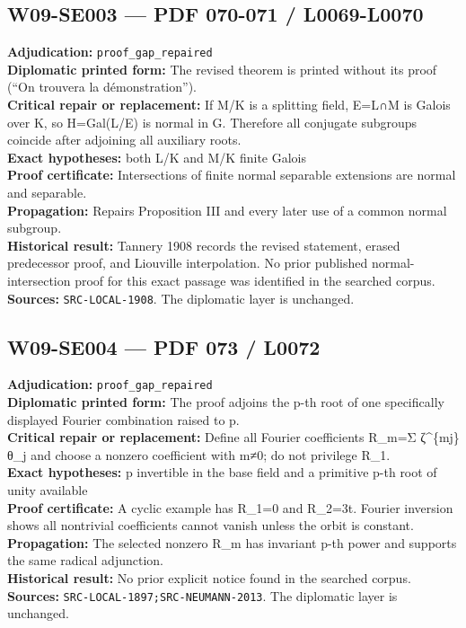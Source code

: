 \documentclass[
  10pt,
  a4paper,
]{scrreprt}
\begin{document}
\subsection{W09-SE003 --- PDF 070-071 /
L0069-L0070}\label{w09-se003-pdf-070-071-l0069-l0070}

\textbf{Adjudication:} \texttt{proof\_gap\_repaired}\\
\textbf{Diplomatic printed form:} The revised theorem is printed without
its proof (``On trouvera la démonstration'').\\
\textbf{Critical repair or replacement:} If M/K is a splitting field,
E=L∩M is Galois over K, so H=Gal(L/E) is normal in G. Therefore all
conjugate subgroups coincide after adjoining all auxiliary roots.\\
\textbf{Exact hypotheses:} both L/K and M/K finite Galois\\
\textbf{Proof certificate:} Intersections of finite normal separable
extensions are normal and separable.\\
\textbf{Propagation:} Repairs Proposition III and every later use of a
common normal subgroup.\\
\textbf{Historical result:} Tannery 1908 records the revised statement,
erased predecessor proof, and Liouville interpolation. No prior
published normal-intersection proof for this exact passage was
identified in the searched corpus.\\
\textbf{Sources:} \texttt{SRC-LOCAL-1908}. The diplomatic layer is
unchanged.

\subsection{W09-SE004 --- PDF 073 /
L0072}\label{w09-se004-pdf-073-l0072}

\textbf{Adjudication:} \texttt{proof\_gap\_repaired}\\
\textbf{Diplomatic printed form:} The proof adjoins the p-th root of one
specifically displayed Fourier combination raised to p.\\
\textbf{Critical repair or replacement:} Define all Fourier coefficients
R\_m=Σ ζ\^{}\{mj\}θ\_j and choose a nonzero coefficient with m≠0; do not
privilege R\_1.\\
\textbf{Exact hypotheses:} p invertible in the base field and a
primitive p-th root of unity available\\
\textbf{Proof certificate:} A cyclic example has R\_1=0 and R\_2=3t.
Fourier inversion shows all nontrivial coefficients cannot vanish unless
the orbit is constant.\\
\textbf{Propagation:} The selected nonzero R\_m has invariant p-th power
and supports the same radical adjunction.\\
\textbf{Historical result:} No prior explicit notice found in the
searched corpus.\\
\textbf{Sources:} \texttt{SRC-LOCAL-1897;SRC-NEUMANN-2013}. The
diplomatic layer is unchanged.
\end{document}
